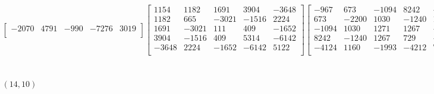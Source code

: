 \documentclass[12pt]{amsart}
\theoremstyle{plain}
\theoremstyle{definition}
\begin{document}
\begin{landscape}
\begin{align*}
\begin{bmatrix}
 -2070  &   4791  &   -990  &   -7276  &   3019  \\ 
\end{bmatrix}
\begin{bmatrix}
1154  &   1182  &   1691  &   3904  &   -3648  \\ 
 1182  &   665  &   -3021  &   -1516  &   2224  \\ 
 1691  &   -3021  &   111  &   409  &   -1652  \\ 
 3904  &   -1516  &   409  &   5314  &   -6142  \\ 
 -3648  &   2224  &   -1652  &   -6142  &   5122  \\ 
\end{bmatrix}
\begin{bmatrix}
-967  &   673  &   -1094  &   8242  &   -4124  \\ 
 673  &   -2200  &   1030  &   -1240  &   1160  \\ 
 -1094  &   1030  &   1271  &   1267  &   -1993  \\ 
 8242  &   -1240  &   1267  &   729  &   -4212  \\ 
 -4124  &   1160  &   -1993  &   -4212  &   756  \\ 
\end{bmatrix}
\begin{bmatrix}
-2483  &   -70  &   47  &   -3673  &   2897  \\ 
 -70  &   -1834  &   1238  &   1594  &   -1503  \\ 
 47  &   1238  &   -2837  &   -343  &   2758  \\ 
 -3673  &   1594  &   -343  &   -7275  &   5115  \\ 
 2897  &   -1503  &   2758  &   5115  &   -6269  \\ 
\end{bmatrix}
\\
(14,10) &:
\begin{bmatrix}
3781  &   4974  &   -225  &   1640  &   963  \\ 
 4974  &   2012  &   -154  &   4722  &   2197  \\ 
 -225  &   -154  &   -62  &   695  &   -1422  \\ 
 1640  &   4722  &   695  &   -1237  &   -2266  \\ 
 963  &   2197  &   -1422  &   -2266  &   437  \\ 
\end{bmatrix}
\begin{bmatrix}
3037  &   6769  &   114  &   1377  &   -1263  \\ 

\end{bmatrix}
\end{align*}
\end{landscape}
\end{document}
